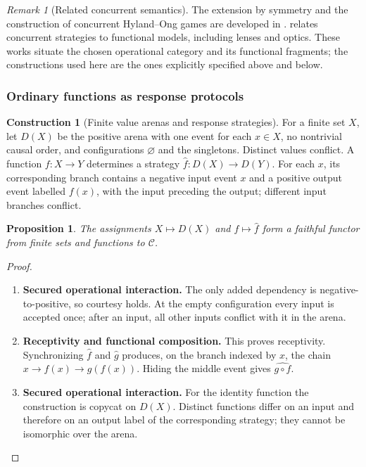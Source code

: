 \documentclass[11pt,a4paper]{article}
\numberwithin{equation}{section}
\newtheorem{proposition}[theorem]{Proposition}
\theoremstyle{definition}
\newtheorem{construction}[construction]{Construction}
\theoremstyle{remark}
\newtheorem{remark}[theorem]{Remark}
\theoremstyle{plain}
\begin{document}
\begin{remark}[Related concurrent semantics]
The extension by symmetry and the construction of concurrent Hyland--Ong
games are developed in \citet{CastellanClairambaultWinskel2019}.
\citet{Winskel2023} relates concurrent strategies to functional models,
including lenses and optics. These works situate the chosen operational
category and its functional fragments; the constructions used here are the
ones explicitly specified above and below.
\end{remark}

\subsubsection{Ordinary functions as response protocols}

\begin{construction}[Finite value arenas and response strategies]
For a finite set $X$, let $D(X)$ be the positive arena with one event for each
$x\in X$, no nontrivial causal order, and configurations $\varnothing$ and
the singletons. Distinct values conflict. A function $f:X\to Y$ determines
a strategy $\widehat f:D(X)\to D(Y)$. For each $x$, its corresponding branch
contains a negative input event $x$ and a positive output event labelled
$f(x)$, with the input preceding the output; different input branches
conflict.
\end{construction}

\begin{proposition}
\label{prop:egt-functions}
The assignments $X\mapsto D(X)$ and $f\mapsto\widehat f$ form a faithful
functor from finite sets and functions to $\mathcal C$.
\end{proposition}
\begin{proof}
\leavevmode
\begin{enumerate}[label=\textup{(\arabic*)},leftmargin=*,itemsep=4pt,topsep=3pt]
  \item \textbf{Secured operational interaction.} The only added dependency is negative-to-positive, so courtesy holds. At the empty configuration every input is accepted once; after an input,
all other inputs conflict with it in the arena.
  \item \textbf{Receptivity and functional composition.} This proves receptivity. Synchronizing $\widehat f$ and $\widehat g$ produces, on the branch indexed
by $x$, the chain $x\to f(x)\to g(f(x))$. Hiding the middle event gives
$\widehat{g\circ f}$.
  \item \textbf{Secured operational interaction.} For the identity function the construction is copycat
on $D(X)$. Distinct functions differ on an input and therefore on an output
label of the corresponding strategy; they cannot be isomorphic over the
arena.
\end{enumerate}
\end{proof}
\end{document}
